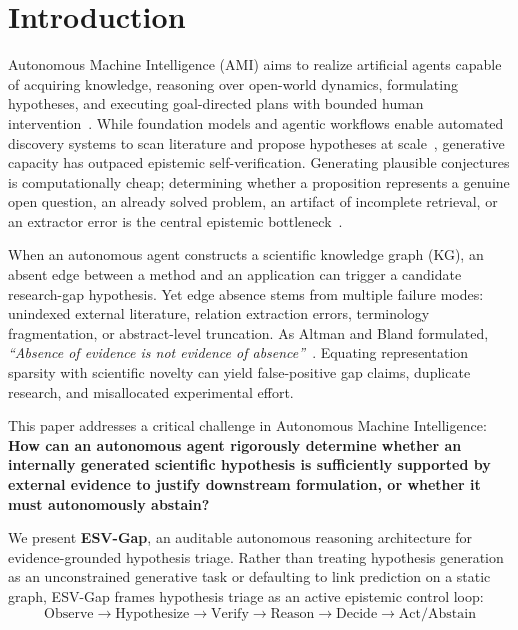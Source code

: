 \documentclass[runningheads]{llncs}
\newcommand{\method}{ESV-Gap}
\begin{document}
\section{Introduction}
\label{sec:intro}

Autonomous Machine Intelligence (AMI) aims to realize artificial agents capable of acquiring knowledge, reasoning over open-world dynamics, formulating hypotheses, and executing goal-directed plans with bounded human intervention~\cite{langley1987,king2009automation,lecun2022path}. While foundation models and agentic workflows enable automated discovery systems to scan literature and propose hypotheses at scale~\cite{aiscientist2024}, generative capacity has outpaced epistemic self-verification. Generating plausible conjectures is computationally cheap; determining whether a proposition represents a genuine open question, an already solved problem, an artifact of incomplete retrieval, or an extractor error is the central epistemic bottleneck~\cite{wadden2020scifact,schneider2022decade}.

When an autonomous agent constructs a scientific knowledge graph (KG), an absent edge between a method and an application can trigger a candidate research-gap hypothesis. Yet edge absence stems from multiple failure modes: unindexed external literature, relation extraction errors, terminology fragmentation, or abstract-level truncation. As Altman and Bland formulated, \emph{``Absence of evidence is not evidence of absence''}~\cite{altman1995absence}. Equating representation sparsity with scientific novelty can yield false-positive gap claims, duplicate research, and misallocated experimental effort.

This paper addresses a critical challenge in Autonomous Machine Intelligence: \textbf{How can an autonomous agent rigorously determine whether an internally generated scientific hypothesis is sufficiently supported by external evidence to justify downstream formulation, or whether it must autonomously abstain?}

We present \textbf{\method{}}, an auditable autonomous reasoning architecture for evidence-grounded hypothesis triage. Rather than treating hypothesis generation as an unconstrained generative task or defaulting to link prediction on a static graph, \method{} frames hypothesis triage as an active epistemic control loop:
\begin{equation}
\label{eq:loop}
\text{Observe} \longrightarrow \text{Hypothesize} \longrightarrow \text{Verify} \longrightarrow \text{Reason} \longrightarrow \text{Decide} \longrightarrow \text{Act/Abstain}
\end{equation}
\end{document}
